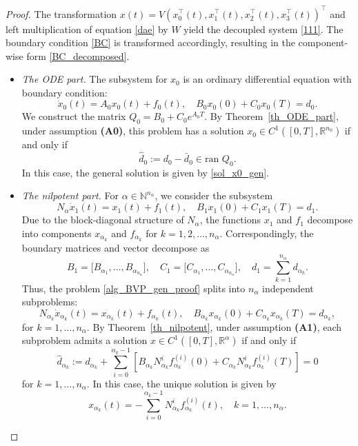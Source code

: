 \documentclass[preprint,12pt]{elsarticle}
\numberwithin{equation}{section}
\theoremstyle{definition}
\begin{document}
\begin{proof}
The transformation $x(t) = V\left(x_0^\top(t), x_1^\top(t), x_2^\top(t), x_3^\top(t)\right)^\top$ and left multiplication of equation \eqref{dae} by $W$ yield the decoupled system \eqref{111}. The boundary condition \eqref{BC} is transformed accordingly, resulting in the component-wise form \eqref{BC_decomposed}.


\begin{itemize}
    \item[(i)] \emph{The ODE part.} The subsystem for $x_0$ is an ordinary differential equation with boundary condition:
    \[
    \dot{x}_0(t) = A_0 x_0(t) + f_0(t), \quad B_0 x_0(0) + C_0 x_0(T) = d_0.
    \]
    We construct the matrix $Q_0 = B_0 + C_0 e^{A_0 T}$. By Theorem~\ref{th_ODE_part}, under assumption \textbf{(A0)}, this problem has a solution $x_0 \in C^1([0,T],\mathbb{R}^{n_0})$ if and only if
    \[
    \widehat{d}_0 := d_0 - \bar{d}_0  \in \text{ran } Q_0.
    \]
    In this case, the general solution is given by \eqref{sol_x0_gen}.


\item[(ii)] \emph{The nilpotent part.} For $\alpha \in \mathbb{N}^{n_{\alpha}}$, we consider the subsystem
\begin{equation}\label{alg_BVP_gen_proof}
    N_{\alpha} \dot{x}_1(t) = x_1(t) + f_1(t), \quad B_1 x_1(0) + C_1 x_1(T) = d_1.
\end{equation}
Due to the block-diagonal structure of $N_{\alpha}$, the functions $x_1$ and $f_1$ decompose into components $x_{\alpha_k}$ and $f_{\alpha_k}$ for $k=1,2,\ldots,n_\alpha$. Correspondingly, the boundary matrices and vector decompose as
\[
    B_1 = \big[B_{\alpha_1}, \ldots, B_{\alpha_{n_\alpha}}\big], \quad 
    C_1 = \big[C_{\alpha_1}, \ldots, C_{\alpha_{n_\alpha}}\big], \quad 
    d_1 = \sum_{k=1}^{n_\alpha} d_{\alpha_k}.
\]
Thus, the problem \eqref{alg_BVP_gen_proof} splits into $n_\alpha$ independent subproblems:
\[
    N_{\alpha_k} \dot{x}_{\alpha_k}(t) = x_{\alpha_k}(t) + f_{\alpha_k}(t), \quad 
    B_{\alpha_k} x_{\alpha_k}(0) + C_{\alpha_k} x_{\alpha_k}(T) = d_{\alpha_k}, 
\]
for $k = 1,\ldots,n_\alpha$. By Theorem~\ref{th_nilpotent}, under assumption \textbf{(A1)}, each subproblem admits a solution $x \in C^1([0,T],\mathbb{R}^\alpha)$ if and only if
\[
    \widehat{d}_{\alpha_k}:=d_{\alpha_k}+\sum_{i=0}^{\alpha_k - 1} \left[ B_{\alpha_k} N_{\alpha_k}^i f_{\alpha_k}^{(i)}(0) + C_{\alpha_k} N_{\alpha_k}^i f_{\alpha_k}^{(i)}(T) \right] = 0
\]
for $k = 1,\ldots,n_\alpha$.
In this case, the unique solution is given by
\[
    x_{\alpha_k}(t) = -\sum_{i=0}^{\alpha_k - 1} N_{\alpha_k}^i f_{\alpha_k}^{(i)}(t), \quad k = 1,\ldots,n_\alpha.
\]


\end{itemize}
\end{proof}
\end{document}
